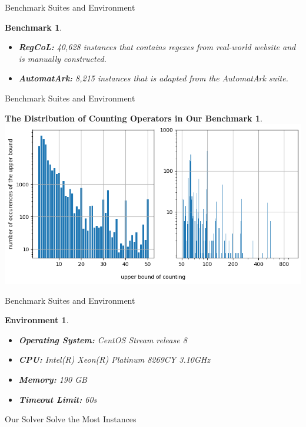 \documentclass[landscape]{beamer}
\newtheorem{benchmark}{Benchmark}
\newtheorem{environment}{Environment}
\newtheorem{distribution}{The Distribution of Counting Operators in Our Benchmark}
\begin{document}
\begin{frame}{Benchmark Suites and Environment}
  \begin{benchmark}
    \begin{itemize}
      \item \textbf{RegCoL:} 40,628 instances that contains regexes from real-world website and is manually constructed.
      \item \textbf{AutomatArk:}  8,215 instances that is adapted from the AutomatArk suite.
    \end{itemize}
  \end{benchmark}
\end{frame}

\begin{frame}{Benchmark Suites and Environment}
  \begin{distribution}
    \includegraphics[width=\linewidth]{counting_distribution.png}
  \end{distribution}
\end{frame}

\begin{frame}{Benchmark Suites and Environment}
  \begin{environment}
    \begin{itemize}
      \item \textbf{Operating System: } CentOS Stream release 8
      \item \textbf{CPU: } Intel(R) Xeon(R) Platinum 8269CY 3.10GHz
      \item \textbf{Memory: } 190 GB
      \item \textbf{Timeout Limit: } 60s
    \end{itemize}
  \end{environment}
\end{frame}

\begin{frame}{Our Solver Solve the Most Instances}
  \centering
  
\end{frame}
\end{document}
